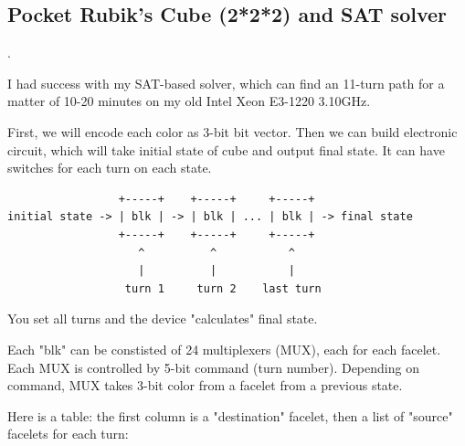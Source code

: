 \subsection{Pocket Rubik's Cube (2*2*2) and SAT solver}
\label{PocketCubeSAT}.

I had success with my SAT-based solver, which can find an 11-turn path for a matter of 10-20 minutes on my old
Intel Xeon E3-1220 3.10GHz.

First, we will encode each color as 3-bit bit vector.
Then we can build electronic circuit, which will take initial state of cube and output final state.
It can have switches for each turn on each state.

\begin{lstlisting}
                 +-----+    +-----+     +-----+
initial state -> | blk | -> | blk | ... | blk | -> final state
                 +-----+    +-----+     +-----+
                    ^          ^           ^
                    |          |           |
                  turn 1     turn 2    last turn
\end{lstlisting}

You set all turns and the device "calculates" final state.

Each "blk" can be constisted of 24 multiplexers (MUX), each for each facelet.
Each MUX is controlled by 5-bit command (turn number).
Depending on command, MUX takes 3-bit color from a facelet from a previous state.

Here is a table: the first column is a "destination" facelet, then a list of "source" facelets for each turn:

